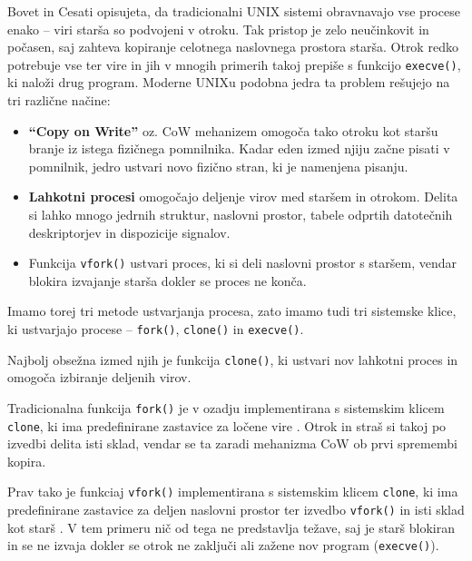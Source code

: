 \documentclass[a4paper,12pt,openright]{book}
\begin{document}
Bovet in Cesati \cite{Bovet_Cesati_2005} opisujeta, da tradicionalni UNIX sistemi obravnavajo vse procese enako -- viri starša so podvojeni v otroku.
Tak pristop je zelo neučinkovit in počasen, saj zahteva kopiranje celotnega naslovnega prostora starša.
Otrok redko potrebuje vse ter vire in jih v mnogih primerih takoj prepiše s funkcijo \texttt{execve()}, ki naloži drug program.
Moderne UNIXu podobna jedra ta problem rešujejo na tri različne načine:
\begin{itemize}
	\item \textbf{``Copy on Write''} oz. CoW mehanizem omogoča tako otroku kot staršu branje iz istega fizičnega pomnilnika.
	      Kadar eden izmed njiju začne pisati v pomnilnik, jedro ustvari novo fizično stran, ki je namenjena pisanju.
	\item \textbf{Lahkotni procesi} omogočajo deljenje virov med staršem in otrokom.
	      Delita si lahko mnogo jedrnih struktur, naslovni prostor, tabele odprtih datotečnih deskriptorjev in dispozicije signalov.
	\item Funkcija \texttt{vfork()} ustvari proces, ki si deli naslovni prostor s staršem, vendar blokira izvajanje starša dokler se proces ne konča.
\end{itemize}

Imamo torej tri metode ustvarjanja procesa, zato imamo tudi tri sistemske klice, ki ustvarjajo procese -- \texttt{fork()}, \texttt{clone()} in \texttt{execve()}.

Najbolj obsežna izmed njih je funkcija \texttt{clone()}, ki ustvari nov lahkotni proces in omogoča izbiranje deljenih virov.

Tradicionalna funkcija \texttt{fork()} je v ozadju implementirana s sistemskim klicem \texttt{clone}, ki ima predefinirane zastavice za ločene vire \cite{Bovet_Cesati_2005}.
Otrok in straš si takoj po izvedbi delita isti sklad, vendar se ta zaradi mehanizma CoW ob prvi spremembi kopira.

Prav tako je funkciaj \texttt{vfork()} implementirana s sistemskim klicem \texttt{clone}, ki ima predefinirane zastavice za deljen naslovni prostor ter izvedbo \texttt{vfork()} in isti sklad kot starš \cite{Bovet_Cesati_2005}.
V tem primeru nič od tega ne predstavlja težave, saj je starš blokiran in se ne izvaja dokler se otrok ne zaključi ali zažene nov program (\texttt{execve()}).
\end{document}
